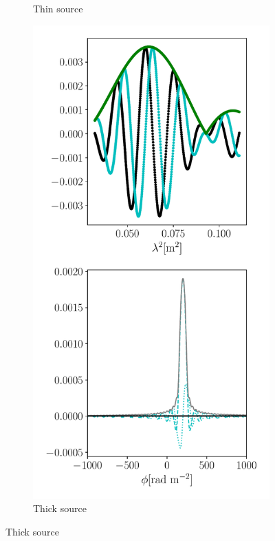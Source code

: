 \documentclass[xetex,aspectratio=169]{beamer}
\begin{document}
\begin{frame}
\begin{figure}
\begin{subfigure}{0.2\textwidth}
			\caption{Thin source}
		\end{subfigure}
		\begin{subfigure}{0.2\textwidth}
			\includegraphics[width=\textwidth]{figures/sources/thick_source.pdf}
			\caption{Thick source}

\end{subfigure}
\end{figure}
\end{frame}
\end{document}
